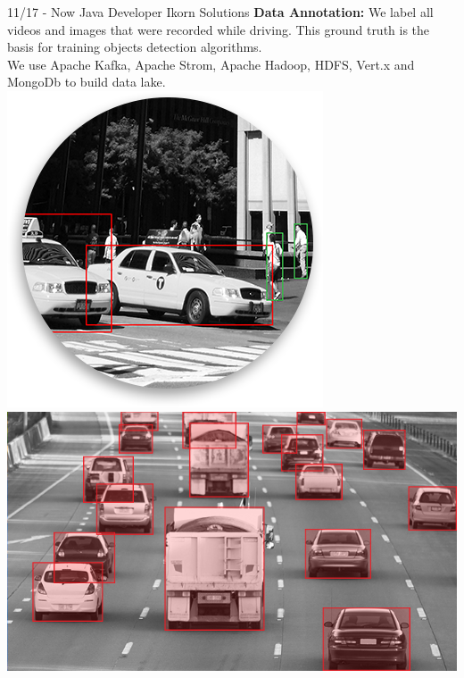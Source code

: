 \documentclass[]{friggeri-cv}
\begin{document}
\begin{entrylist}
\entry
    {11/17 - Now}
    {Java Developer}
    {Ikorn Solutions}
	{\textbf{Data Annotation: } We label all videos and images that were recorded while driving. This ground truth is the basis for training objects detection algorithms.\\
	We use Apache Kafka, Apache Strom, Apache Hadoop, HDFS, Vert.x and MongoDb to build data lake.\\
		
	\includegraphics[scale=0.3]{img/labeling_img_14.png} \hspace{1cm}
	\includegraphics[scale=0.25]{img/labeling_img_5_1.png}\\
}
\end{entrylist}
\end{document}
